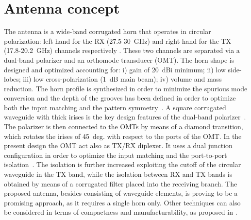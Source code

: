 \documentclass[conference,10pt,a4paper]{IEEEtran}%
\begin{document}
\section{Antenna concept}
\label{sec:ant-des}
The antenna is a wide-band corrugated horn that operates in circular polarization: left-hand for the RX (27.5-30~GHz) and right-hand for the TX (17.8-20.2~GHz) channels respectively
.
These two channels are separated via a dual-band polarizer and an orthomode transducer (OMT).
The horn shape is designed and optimized accounting for: i) gain of 20~dBi minimum; ii) low side-lobes; iii) low cross-polarization (1~dB main beam); iv) volume and mass reduction.
The horn profile is synthesized in order to minimize the spurious mode conversion and the depth of the grooves has been defined in order to optimize both the input matching and the pattern symmetry~\cite{Teniente2002}.
A square corrugated waveguide with thick irises is the key design features of the dual-band polarizer~\cite{Liu2008}.
The polarizer is then connected to the OMTs by means of a diamond transition, which rotates the irises of 45~deg. with respect to the ports of the OMT.
In the present design the OMT act also as TX/RX diplexer.
It uses a dual junction configuration in order to optimize the input matching and the port-to-port isolation~\cite{DArcangelo2009}.
The isolation is further increased exploiting the cutoff of the circular waveguide in the TX band, while the isolation between RX and TX bands is obtained by means of a corrugated filter placed into the receiving branch.
The proposed antenna, besides consisting of waveguide elements, is proving to be a promising approach, as it requires a single horn only.
Other techniques can also be considered in terms of compactness and manufacturability, as proposed in \cite{Buttazzoni2017}.

\end{document}
